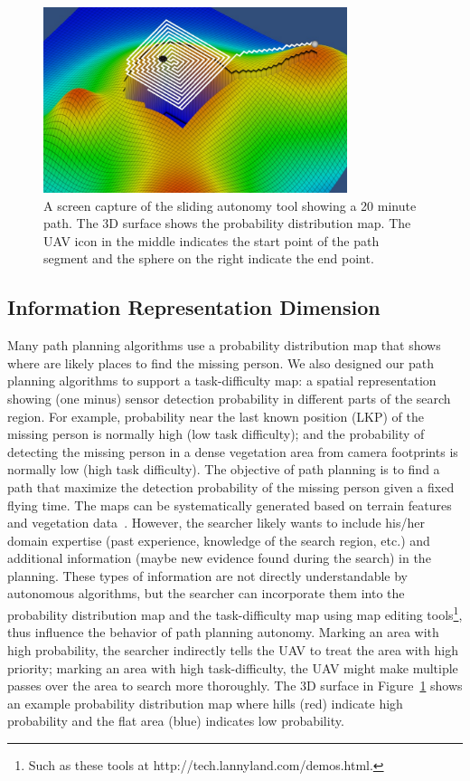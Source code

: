 \documentclass[journal]{IEEEtran}
\begin{document}
\begin{figure}
\centering
\includegraphics[width=3.5in]{Dimensions.JPG}
\caption{A screen capture of the sliding autonomy tool showing a 20 minute path. The 3D surface shows the probability distribution map. The UAV icon in the middle indicates the start point of the path segment and the sphere on the right indicate the end point.}
\label{dimensions}
\end{figure}

\subsection{Information Representation Dimension}

Many path planning algorithms use a probability distribution map that shows where are likely places to find the missing person. We also designed our path planning algorithms to support a task-difficulty map: a spatial representation showing (one minus) sensor detection probability in different parts of the search region. For example, probability near the last known position (LKP) of the missing person is normally high (low task difficulty); and the probability of detecting the missing person in a dense vegetation area from camera footprints is normally low (high task difficulty). The objective of path planning is to find a path that maximize the detection probability of the missing person given a fixed flying time. The maps can be systematically generated based on terrain features and vegetation data~\cite{Lin2010Bayesian, Lin2014Hierarchical}. However, the searcher likely wants to include his/her domain expertise (past experience, knowledge of the search region, etc.) and additional information (maybe new evidence found during the search) in the planning. These types of information are not directly understandable by autonomous algorithms, but the searcher can incorporate them into the probability distribution map and the task-difficulty map using map editing tools\footnote{Such as these tools at http://tech.lannyland.com/demos.html.}, thus influence the behavior of path planning autonomy. Marking an area with high probability, the searcher indirectly tells the UAV to treat the area with high priority; marking an area with high task-difficulty, the UAV might make multiple passes over the area to search more thoroughly. The 3D surface in Figure~\ref{dimensions} shows an example probability distribution map where hills (red) indicate high probability and the flat area (blue) indicates low probability.
\end{document}
